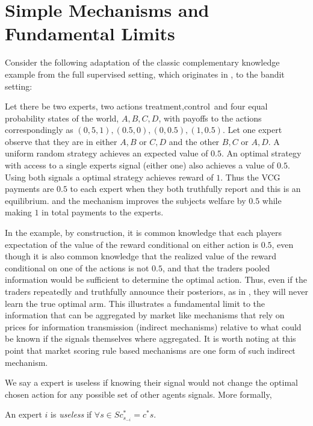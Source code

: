 \section{Simple Mechanisms and Fundamental Limits}

Consider the following adaptation of the classic complementary knowledge example from the full supervised setting, which originates in \cite{geanakoplos1982we}, to the bandit setting:

\begin{eg}\label{eg:comp-ex}
	Let there be two experts, two actions ${\text{treatment},\text{control}}$ and four equal probability states of the world, ${A,B,C,D}$, with payoffs to the actions correspondingly as ${(0,5,1),(0.5,0),(0,0.5),(1,0.5)}$. Let one expert observe that they are in either ${A,B}$ or ${C,D}$ and the other ${B,C}$ or ${A,D}$. A uniform random strategy achieves an expected value of $0.5$. An optimal strategy with access to a single experts signal (either one) also achieves a value of $0.5$. Using both signals a optimal strategy achieves reward of $1$. Thus the VCG payments are $0.5$ to each expert when they both truthfully report and this is an equilibrium. and the mechanism improves the subjects welfare by $0.5$ while making $1$ in total payments to the experts. 
\end{eg}

In the example, by construction, it is common knowledge that each players expectation of the value of the reward conditional on either action is $0.5$, even though it is also common knowledge that the realized value of the reward conditional on one of the actions is not $0.5$, and that the traders pooled information would be sufficient to determine the optimal action. 
Thus, even if the traders repeatedly and truthfully announce their posteriors, as in \cite{geanakoplos1982we}, they will never learn the true optimal arm. 
This illustrates a fundamental limit to the information that can be aggregated by market like mechanisms that rely on prices for information transmission (indirect mechanisms) relative to what could be known if the signals themselves where aggregated. 
It is worth noting at this point that market scoring rule based mechanisms are one form of such indirect mechanism.


We say a expert is useless if knowing their signal would not change the optimal chosen action for any possible set of other agents signals. More formally,

\begin{defn}\label{defn:useless}
	An expert $i$ is \emph{useless} if $\forall s  \in S c^{*}_{s_{-i}} = c^{*}{s}$.
\end{defn}

